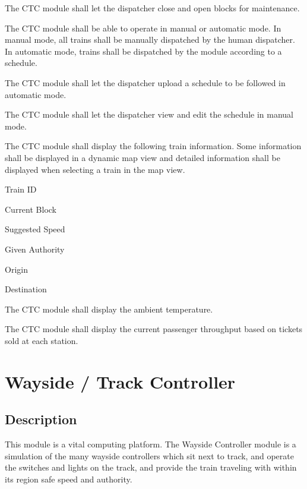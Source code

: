 \documentclass{scrreprt}
\begin{document}
\begin{numonly}
\begin{numonly}
    \end{numonly}
    \item The CTC module shall let the dispatcher close and open blocks for maintenance.
    \item The CTC module shall be able to operate in manual or automatic mode. In manual
    mode, all trains shall be manually dispatched by the human dispatcher. In automatic
    mode, trains shall be dispatched by the module according to a schedule.
    \item The CTC module shall let the dispatcher upload a schedule to be followed in
    automatic mode.
    \item The CTC module shall let the dispatcher view and edit the schedule in manual mode.
    \item The CTC module shall display the following train information. Some information
    shall be displayed in a dynamic map view and detailed information shall be displayed
    when selecting a train in the map view.
    \begin{numonly}
        \item Train ID
        \item Current Block
        \item Suggested Speed
        \item Given Authority
        \item Origin
        \item Destination
    \end{numonly}
    \item The CTC module shall display the ambient temperature.
    \item The CTC module shall display the current passenger throughput based on tickets
    sold at each station.
\end{numonly}


\section{Wayside / Track Controller}

\subsection{Description}
This module is a vital computing platform.
The Wayside Controller module is a simulation of the many wayside controllers which sit next to track, and operate the switches and lights on the track, and provide the train traveling with within its region safe speed and authority.
\end{document}
